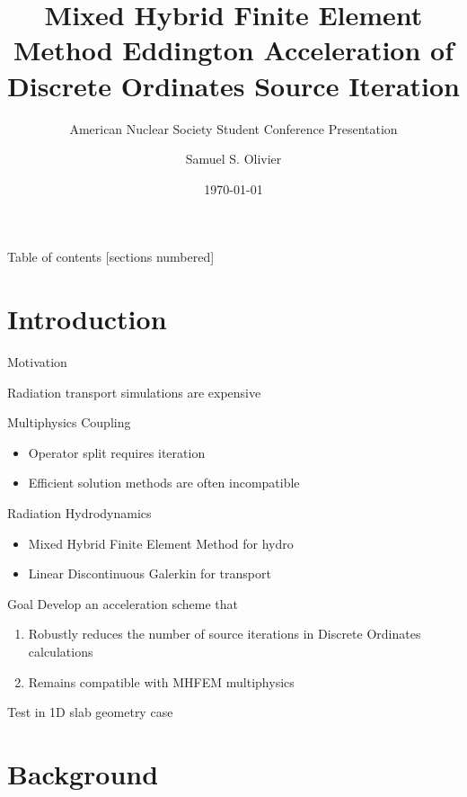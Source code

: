 \documentclass[10pt]{beamer}
\title{Mixed Hybrid Finite Element Method Eddington Acceleration of Discrete Ordinates Source Iteration}
\subtitle{\normalsize American Nuclear Society Student Conference Presentation}
\date{\today}
\author{Samuel S. Olivier }
\institute{Department of Nuclear Engineering, Texas A\&M University}
\begin{document}

\maketitle

\begin{frame}{Table of contents}
  [sections numbered]
  \tableofcontents[hideallsubsections]
\end{frame}

\section{Introduction}

\begin{frame}{Motivation}
    
    Radiation transport simulations are expensive 

    Multiphysics Coupling 
        \begin{itemize}
            \item Operator split requires iteration
            \item Efficient solution methods are often incompatible 
        \end{itemize}

    Radiation Hydrodynamics 
        \begin{itemize}
            \item Mixed Hybrid Finite Element Method for hydro 
            \item Linear Discontinuous Galerkin for transport 
        \end{itemize}

    \begin{block}{Goal}
        Develop an acceleration scheme that 
            \begin{enumerate}
                \item Robustly reduces the number of source iterations in Discrete Ordinates calculations 

                \item Remains compatible with MHFEM multiphysics 
            \end{enumerate}
        Test in 1D slab geometry case
    \end{block}

\end{frame}

\section{Background}
\end{document}
